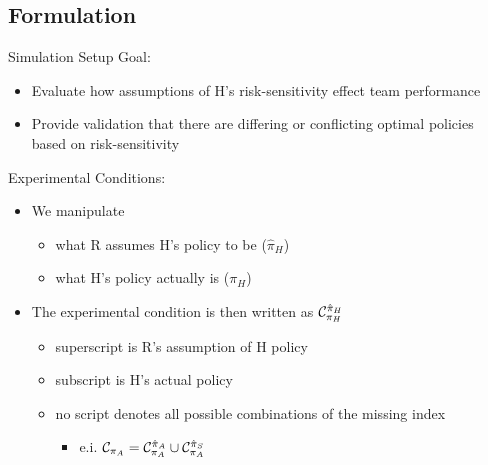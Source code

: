 \documentclass[aspectratio=1610, xcolor=dvipsnames]{packages/beamer}
\begin{document}
\subsection{Formulation}
\begin{frame}{Simulation Setup}
    Goal: \begin{itemize}
        \item Evaluate how assumptions of H's risk-sensitivity effect team performance
        \item Provide validation that there are differing or conflicting optimal policies based on risk-sensitivity
    \end{itemize}
    Experimental Conditions: \begin{itemize}
        \item We manipulate
        \begin{itemize}
            \item what R assumes H's policy to be ($\hat{\pi}_{H}$)
            \item what H's policy actually is ($\pi_{H}$)
        \end{itemize}
        \item The experimental condition is then written as $\cond[H][H]$
        \begin{itemize}
             \item superscript is R's assumption of H policy
             \item subscript is H's actual policy
            \item no script denotes all possible combinations of the missing index
            \begin{itemize}
                \item e.i. $\cond[][A] =\cond[A][A] \cup \cond[S][A]$
            \end{itemize}
        \end{itemize}

    \end{itemize}
\end{frame}
\end{document}
